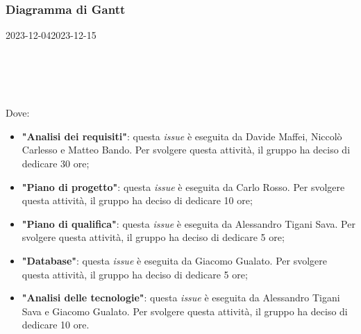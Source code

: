 
\subsubsection{Diagramma di Gantt}

\begin{ganttchart}[
		x unit=0.6cm, %
		y unit chart=0.6cm,
		bar/.style={fill=blue!50},
		bar height=0.5,
		time slot format=isodate,
		time slot unit=day,
		vgrid,
		today=2023-12-04,
		today rule/.style={draw=red, ultra thick}
	]{2023-12-04}{2023-12-15}
	 \\
	 \\
	 \\
	 \\
	 \\
\end{ganttchart}

Dove:
\begin{itemize}
	\item \textbf{"Analisi dei requisiti"}: questa \textit{issue} è eseguita da
	      Davide Maffei, Niccolò Carlesso e Matteo Bando. Per
	      svolgere questa attività, il gruppo ha deciso di dedicare 30 ore;

	\item \textbf{"Piano di progetto"}: questa \textit{issue} è eseguita da
	      Carlo Rosso. Per svolgere questa attività, il gruppo ha deciso
	      di dedicare 10 ore;

	\item \textbf{"Piano di qualifica"}: questa \textit{issue} è eseguita da
	      Alessandro Tigani Sava. Per svolgere questa attività, il gruppo ha
	      deciso di dedicare 5 ore;

	\item \textbf{"Database"}: questa \textit{issue} è eseguita da Giacomo
	      Gualato. Per svolgere questa attività, il gruppo ha deciso di
	      dedicare 5 ore;

	\item \textbf{"Analisi delle tecnologie"}: questa \textit{issue} è eseguita
	      da Alessandro Tigani Sava e Giacomo Gualato. Per svolgere questa
	      attività, il gruppo ha deciso di dedicare 10 ore.
\end{itemize}

